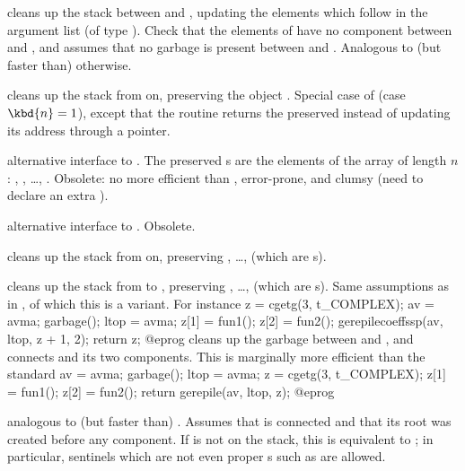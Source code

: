 cleans up the stack between  and , updating
the  elements which follow  in the argument list (of type
). Check that the elements of  have no component between
 and , and assumes that no garbage is present between
 and . Analogous to (but faster than) 
otherwise.

 cleans up the stack  from
 on, preserving the object . Special case of 
(case $\kbd{n} = 1$), except that the routine returns the preserved 
instead of updating its address through a pointer.

 alternative interface
to . The preserved s are the elements of the array
 of length $n$: , , \dots,
. Obsolete: no more efficient than ,
error-prone, and clumsy (need to declare an extra ).

alternative interface to . Obsolete.

 cleans up the stack
from  on, preserving , \dots,  (which are
s).

cleans up the stack from  to , preserving ,
\dots,  (which are s). Same assumptions as in
, of which this is a variant. For instance
\bprog
  z = cgetg(3, t_COMPLEX);
  av = avma; garbage(); ltop = avma;
  z[1] = fun1();
  z[2] = fun2();
  gerepilecoeffssp(av, ltop, z + 1, 2);
  return z;
@eprog\noindent
cleans up the garbage between  and , and connects 
and its two components. This is marginally more efficient than the standard
\bprog
  av = avma; garbage(); ltop = avma;
  z = cgetg(3, t_COMPLEX);
  z[1] = fun1();
  z[2] = fun2(); return gerepile(av, ltop, z);
@eprog\noindent

 analogous to (but faster than)
. Assumes that  is connected and that its root was
created before any component. If  is not on the stack, this is
equivalent to ; in particular, sentinels which are not even
proper s such as  are allowed.

